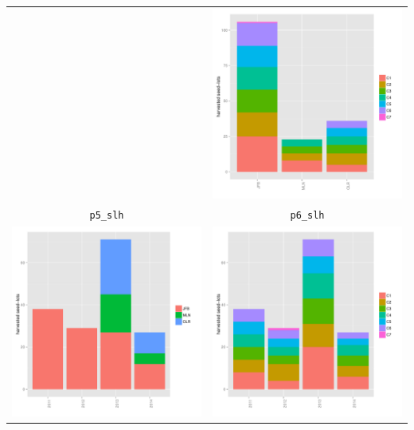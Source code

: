 \documentclass{article}\usepackage[]{graphicx}\usepackage[]{color}
\newenvironment{knitrout}{}{} %
\begin{document}
\begin{itemize}
\begin{center}
\begin{tabular}{cc}
\begin{knitrout}
{}



\end{knitrout}
&
\begin{knitrout}
\definecolor{shadecolor}{rgb}{0.969, 0.969, 0.969}\color{fgcolor}

{\centering \includegraphics[width=.4\textwidth]{figures/shinemas2R_unnamed-chunk-35-1} 

}



\end{knitrout}
\\
\texttt{p5\_slh} & \texttt{p6\_slh} \\
\begin{knitrout}
\definecolor{shadecolor}{rgb}{0.969, 0.969, 0.969}\color{fgcolor}

{\centering \includegraphics[width=.4\textwidth]{figures/shinemas2R_unnamed-chunk-36-1} 

}



\end{knitrout}
&
\begin{knitrout}
\definecolor{shadecolor}{rgb}{0.969, 0.969, 0.969}\color{fgcolor}

{\centering \includegraphics[width=.4\textwidth]{figures/shinemas2R_unnamed-chunk-37-1} 

}
\end{knitrout}
\end{tabular}
\end{center}
\end{itemize}
\end{document}
